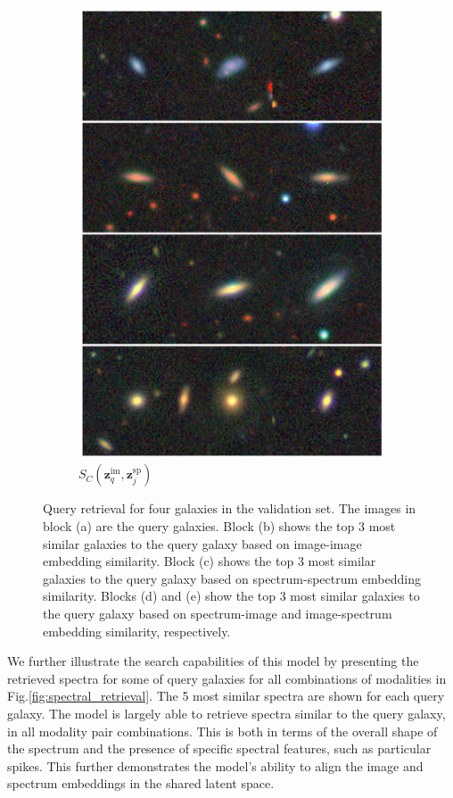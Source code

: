 \documentclass[draft, a4paper,12pt]{article}
\begin{document}
\begin{figure}[H]
\begin{subfigure}{0.22\textwidth}
        \includegraphics[height=0.21\textheight]{../figures/images_sp_im.png}
        \caption{$S_C(\mathbf{z}_q^{\text{im}}, \mathbf{z}_j^{\text{sp}})$}
        \label{fig:retrieval_5}
    \end{subfigure}
    \caption{Query retrieval for four galaxies in the validation set. The images in block (a) are the query galaxies. Block (b) shows the top 3 most similar galaxies to the query galaxy based on image-image embedding similarity. Block (c) shows the top 3 most similar galaxies to the query galaxy based on spectrum-spectrum embedding similarity. Blocks (d) and (e) show the top 3 most similar galaxies to the query galaxy based on spectrum-image and image-spectrum embedding similarity, respectively.}
    \label{fig:retrieval}
\end{figure}
We further illustrate the search capabilities of this model by presenting the retrieved spectra for some of query galaxies for all combinations of modalities in Fig.\ref{fig:spectral_retrieval}. The 5 most similar spectra are shown for each query galaxy. The model is largely able to retrieve spectra similar to the query galaxy, in all modality pair combinations. This is both in terms of the overall shape of the spectrum and the presence of specific spectral features, such as particular spikes. This further demonstrates the model's ability to align the image and spectrum embeddings in the shared latent space.
\end{document}
